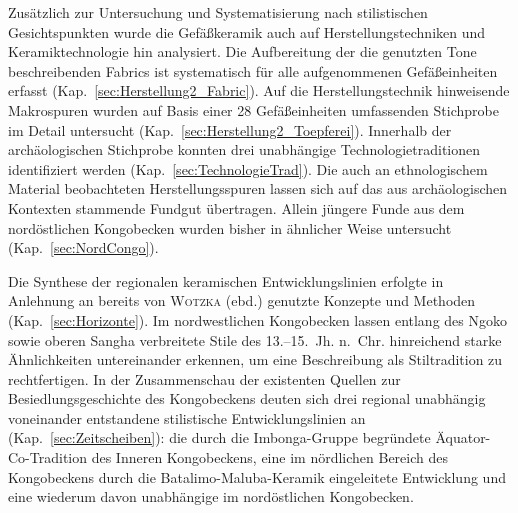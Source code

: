 \begin{multicols}{2}
Zusätzlich zur Untersuchung und Systematisierung nach stilistischen Gesichtspunkten wurde die Gefäßkeramik auch auf Herstellungstechniken und Keramiktechnologie hin analysiert. Die Aufbereitung der die genutzten Tone beschreibenden Fabrics ist systematisch für alle aufgenommenen Gefäßeinheiten erfasst (Kap.~\ref{sec:Herstellung2_Fabric}). Auf die Herstellungstechnik hinweisende Makrospuren wurden auf Basis einer 28 Gefäßeinheiten umfassenden Stichprobe im Detail untersucht (Kap.~\ref{sec:Herstellung2_Toepferei}). Innerhalb der archäologischen Stichprobe konnten drei unabhängige Technologietraditionen identifiziert werden (Kap.~\ref{sec:TechnologieTrad}). Die auch an ethnologischem Material beobachteten Herstellungsspuren  lassen sich auf das aus archäologischen Kontexten stammende Fundgut übertragen. Allein jüngere Funde aus dem nordöstlichen Kongobecken wurden bisher in ähnlicher Weise untersucht (Kap.~\ref{sec:NordCongo}). 

Die Synthese der regionalen keramischen Entwicklungslinien erfolgte in Anlehnung an bereits von \textsc{Wotzka} (ebd.) genutzte Konzepte und Methoden (Kap.~\ref{sec:Horizonte}). Im nordwestlichen Kongobecken lassen entlang des Ngoko sowie oberen Sangha verbreitete Stile des 13.--15.~Jh. n.~Chr. hinreichend starke Ähnlichkeiten untereinander erkennen, um eine Beschreibung als Stiltradition zu rechtfertigen. In der Zusammenschau der existenten Quellen zur Besiedlungsgeschichte des Kongobeckens deuten sich drei regional unabhängig voneinander entstandene stilistische Entwicklungslinien an (Kap.~\ref{sec:Zeitscheiben}): die durch die Imbonga-Gruppe begründete Äquator-Co-Tradition des Inneren Kongobeckens,  eine im nördlichen Bereich des Kongobeckens durch die Batalimo-Maluba-Keramik eingeleitete Entwicklung und eine wiederum davon unabhängige im nordöstlichen Kongobecken.


\end{multicols}
